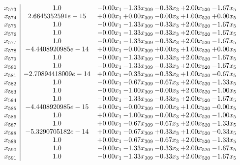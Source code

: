 \documentclass[8pt]{article}
\begin{document}
\[\begin{array}{c| c c@{\hskip 2pt} c@{\hskip 2pt} c@{\hskip 2pt} c@{\hskip 2pt} c@{\hskip 2pt} }
 x_{573}   &  1.0 & -0.00 x_{1} & -1.33 x_{309} & -0.33 x_{3} & +  2.00 x_{520} & -1.67 x_{5}\\
 x_{574}   &  2.6645352591e-15 & +  0.00 x_{1} & +  0.00 x_{309} & -0.00 x_{3} & +  1.00 x_{520} & +  0.00 x_{5}\\
 x_{575}   &  1.0 & -0.00 x_{1} & -1.33 x_{309} & -0.33 x_{3} & +  2.00 x_{520} & -1.67 x_{5}\\
 x_{576}   &  1.0 & -0.00 x_{1} & -1.33 x_{309} & -0.33 x_{3} & +  2.00 x_{520} & -1.67 x_{5}\\
 x_{577}   &  1.0 & -0.00 x_{1} & -1.33 x_{309} & -0.33 x_{3} & +  2.00 x_{520} & -1.67 x_{5}\\
 x_{578}   &  -4.4408920985e-14 & +  0.00 x_{1} & -0.00 x_{309} & +  0.00 x_{3} & +  1.00 x_{520} & +  0.00 x_{5}\\
 x_{579}   &  1.0 & -0.00 x_{1} & -1.33 x_{309} & -0.33 x_{3} & +  2.00 x_{520} & -1.67 x_{5}\\
 x_{580}   &  1.0 & -0.00 x_{1} & -1.33 x_{309} & -0.33 x_{3} & +  2.00 x_{520} & -1.67 x_{5}\\
 x_{581}   &  -2.70894418009e-14 & +  0.00 x_{1} & -0.33 x_{309} & -0.33 x_{3} & +  1.00 x_{520} & -0.67 x_{5}\\
 x_{582}   &  1.0 & -0.00 x_{1} & -0.67 x_{309} & -0.67 x_{3} & +  2.00 x_{520} & -1.33 x_{5}\\
 x_{583}   &  1.0 & -0.00 x_{1} & -1.00 x_{309} & -0.00 x_{3} & +  2.00 x_{520} & -1.00 x_{5}\\
 x_{584}   &  1.0 & -0.00 x_{1} & -1.33 x_{309} & -0.33 x_{3} & +  2.00 x_{520} & -1.67 x_{5}\\
 x_{585}   &  -4.4408920985e-15 & +  0.00 x_{1} & -0.00 x_{309} & -0.00 x_{3} & +  1.00 x_{520} & -0.00 x_{5}\\
 x_{586}   &  1.0 & +  0.00 x_{1} & -1.00 x_{309} & -0.00 x_{3} & +  2.00 x_{520} & -1.00 x_{5}\\
 x_{587}   &  1.0 & +  0.00 x_{1} & -0.67 x_{309} & -0.67 x_{3} & +  2.00 x_{520} & -1.33 x_{5}\\
 x_{588}   &  -5.3290705182e-14 & +  0.00 x_{1} & -0.67 x_{309} & +  0.33 x_{3} & +  1.00 x_{520} & -0.33 x_{5}\\
 x_{589}   &  1.0 & +  0.00 x_{1} & -0.67 x_{309} & -0.67 x_{3} & +  2.00 x_{520} & -1.33 x_{5}\\
 x_{590}   &  1.0 & -0.00 x_{1} & -1.33 x_{309} & -0.33 x_{3} & +  2.00 x_{520} & -1.67 x_{5}\\
 x_{591}   &  1.0 & -0.00 x_{1} & -1.33 x_{309} & -0.33 x_{3} & +  2.00 x_{520} & -1.67 x_{5}\\

\end{array}\]
\end{document}
